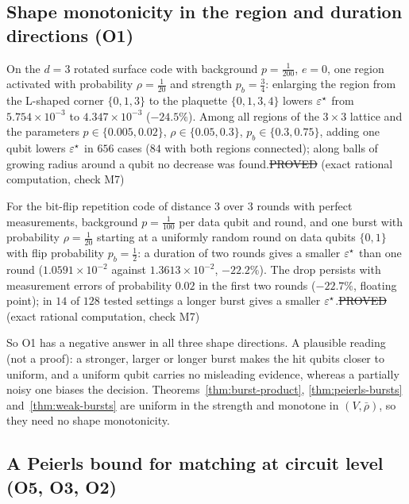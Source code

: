 \subsection{Shape monotonicity in the region and duration directions (O1)}\label{sec:o1-more}

\begin{observation}\label{obs:O1-region}
On the $d=3$ rotated surface code with background $p=\tfrac1{200}$, $e=0$, one region activated with probability $\rho=\tfrac1{20}$ and strength $p_b=\tfrac34$: enlarging the region from the L-shaped corner $\{0,1,3\}$ to the plaquette $\{0,1,3,4\}$ lowers $\varepsilon^{\star}$ from $5.754\times10^{-3}$ to $4.347\times10^{-3}$ ($-24.5\%$). Among all regions of the $3\times3$ lattice and the parameters $p\in\{0.005,0.02\}$, $\rho\in\{0.05,0.3\}$, $p_b\in\{0.3,0.75\}$, adding one qubit lowers $\varepsilon^{\star}$ in $656$ cases ($84$ with both regions connected); along balls of growing radius around a qubit no decrease was found.\hfill\st{PROVED} (exact rational computation, check M7)
\end{observation}

\begin{observation}\label{obs:O1-duration}
For the bit-flip repetition code of distance $3$ over $3$ rounds with perfect measurements, background $p=\tfrac1{100}$ per data qubit and round, and one burst with probability $\rho=\tfrac1{20}$ starting at a uniformly random round on data qubits $\{0,1\}$ with flip probability $p_b=\tfrac12$: a duration of two rounds gives a smaller $\varepsilon^{\star}$ than one round ($1.0591\times10^{-2}$ against $1.3613\times10^{-2}$, $-22.2\%$). The drop persists with measurement errors of probability $0.02$ in the first two rounds ($-22.7\%$, floating point); in $14$ of $128$ tested settings a longer burst gives a smaller $\varepsilon^{\star}$.\hfill\st{PROVED} (exact rational computation, check M7)
\end{observation}

\noindent So O1 has a negative answer in all three shape directions. A plausible reading (not a proof): a stronger, larger or longer burst makes the hit qubits closer to uniform, and a uniform qubit carries no misleading evidence, whereas a partially noisy one biases the decision. Theorems~\ref{thm:burst-product}, \ref{thm:peierls-bursts} and~\ref{thm:weak-bursts} are uniform in the strength and monotone in $(V,\bar\rho)$, so they need no shape monotonicity.

\subsection{A Peierls bound for matching at circuit level (O5, O3, O2)}\label{sec:circuit-peierls}

